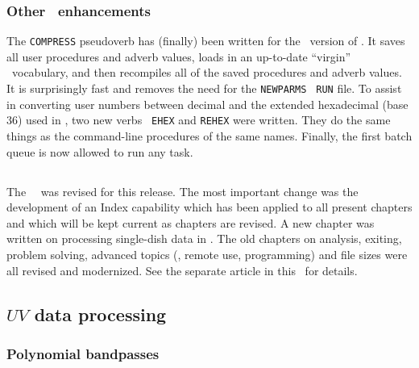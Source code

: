 \subsubsection{Other \POPS\ enhancements}

The {\tt COMPRESS} pseudoverb has (finally) been written for the
\AIPS\ version of \hbox{\POPS}.  It saves all user procedures and
adverb values, loads in an up-to-date ``virgin'' \POPS\ vocabulary,
and then recompiles all of the saved procedures and adverb values.  It
is surprisingly fast and removes the need for the {\tt NEWPARMS} {\tt
RUN} file.  To assist in converting user numbers between decimal and
the extended hexadecimal (base 36) used in \AIPS, two new verbs {\tt
EHEX} and {\tt REHEX} were written.  They do the same things as the
command-line procedures of the same names.  Finally, the first batch
queue is now allowed to run any task.

\subsection{\Cookbook}

The \AIPS\ \Cookbook\ was revised for this release.  The most
important change was the development of an Index capability which has
been applied to all present chapters and which will be kept current as
chapters are revised.  A new chapter was written on processing
single-dish data in \hbox{\AIPS}.  The old chapters on analysis,
exiting, problem solving, advanced topics (\POPS, remote use,
programming) and file sizes were all revised and modernized.  See the
separate article in this \Aipsletter\ for details.

\subsection{$UV$ data processing}

\subsubsection{Polynomial bandpasses}

